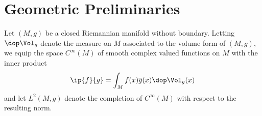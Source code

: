 \section{Geometric Preliminaries}
Let $(M,g)$ be a closed Riemannian manifold without boundary. Letting $\dop \Vol_g$ denote the measure on $M$ associated to the volume form of $(M,g)$, we equip the space $C^\infty(M)$ of smooth complex valued functions on $M$ with the inner product 
\begin{align*}
    \ip{f}{g} = \int_M f(x) \overline{g}(x) \dop \Vol_g(x) 
\end{align*}
and let $L^2(M,g)$ denote the completion of $C^\infty(M)$ with respect to the resulting norm. 